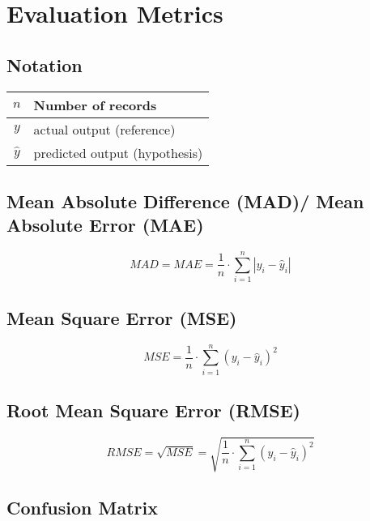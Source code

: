 \chapter{Evaluation Metrics}

\section*{Notation}

\begin{table}[h]
    \centering
    \begin{tabular}{|c|l|}
        \hline
        
       $n$  & Number of records \\ 
       \hline
       
       $y$ & actual output (reference) \\ 
       \hline
       
       $\hat{y}$ & predicted output (hypothesis) \\ 
       \hline 
       
    \end{tabular}
\end{table}


\section{Mean Absolute Difference (MAD)/ Mean Absolute Error (MAE)}\label{Mean Absolute Difference (MAD)}\label{Mean Absolute Error (MAE)}

\[
    MAD = MAE = \displaystyle\frac{1}{n} \cdot \sum_{i=1}^{n} \left| y_i - \hat{y}_i \right|
\]


\section{Mean Square Error (MSE)}\label{Mean Square Error (MSE)}
\[
    MSE = \displaystyle\frac{1}{n} \cdot \sum_{i=1}^{n} ( y_i - \hat{y}_i )^2
\]

\section{Root Mean Square Error (RMSE)}\label{Root Mean Square Error (RMSE)}
\[
    RMSE = \sqrt{MSE} = \displaystyle\sqrt{\frac{1}{n} \cdot \sum_{i=1}^{n} ( y_i - \hat{y}_i )^2}
\]


\section{Confusion Matrix}
